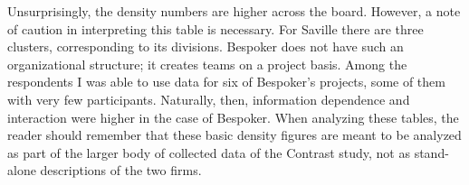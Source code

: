 Unsurprisingly, the density numbers are higher across the board. However, a note of caution in interpreting this table is necessary. For Saville there are three clusters, corresponding to its divisions. Bespoker does not have such an organizational structure; it creates teams on a project basis. Among the respondents I was able to use data for six of Bespoker's projects, some of them with very few participants. Naturally, then, information dependence and interaction were higher in the case of Bespoker. When analyzing these tables, the reader should remember that these basic density figures are meant to be analyzed as part of the larger body of collected data of the Contrast study, not as stand-alone descriptions of the two firms.
